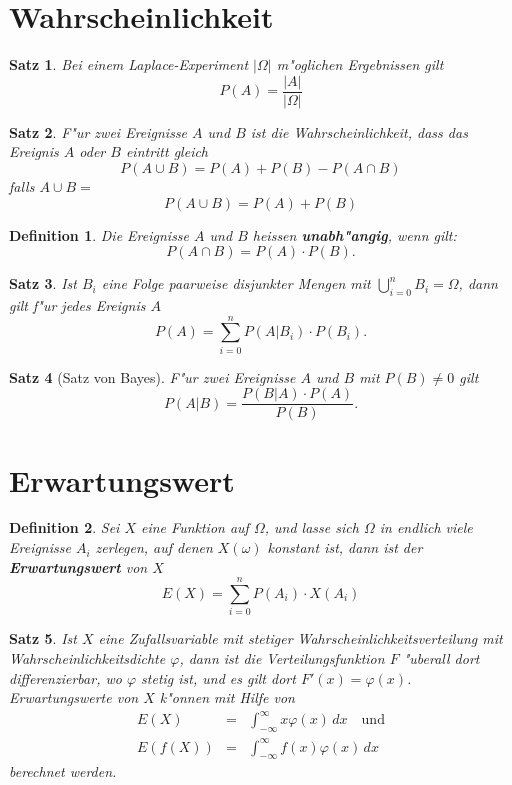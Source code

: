 \documentclass[ngerman, a4paper, 10pt, twocolumn, DIV20, headings=small]{scrartcl}
\newtheorem{definition}{Definition}
\newtheorem{satz}{Satz}
\begin{document}
\section{Wahrscheinlichkeit}
\label{sec:wahrscheinlichkeit}


\begin{satz}
  Bei einem Laplace-Experiment $| \Omega |$ m"oglichen Ergebnissen gilt
\[
P(A) = \frac{|A|}{|\Omega|}
\]
\end{satz}

\begin{satz}
F"ur zwei Ereignisse $A$ und $B$ ist die Wahrscheinlichkeit, dass das Ereignis $A$ oder $B$ eintritt gleich
\[
P(A\cup B) = P(A) + P(B) - P(A\cap B)
\]
falls $ A \cup B = {} $
\[
P(A\cup B) = P(A) + P(B)
\]
\end{satz}

\begin{definition}
Die Ereignisse $A$ und $B$ heissen {\bf unabh"angig}, wenn gilt:
\[
P(A\cap B) = P(A)\cdot P(B).
\]
\end{definition}

\begin{satz}
Ist $B_i$ eine Folge paarweise disjunkter Mengen mit $\bigcup_{i=0}^{n}B_i=\Omega$, dann gilt f"ur jedes Ereignis $A$
\[
P(A)=\sum_{i=0}^{n}P(A|B_i)\cdot P(B_i).
\]
\end{satz}

\begin{satz}[Satz von Bayes]
F"ur zwei Ereignisse $A$ und $B$ mit $P(B)\ne0$ gilt
\[
P(A|B)=\frac{P(B|A)\cdot P(A)}{P(B)}.
\]
\end{satz}

\section{Erwartungswert}
\label{sec:erwartungswert}


\begin{definition}
Sei $X$ eine Funktion auf $\Omega$, und lasse sich $\Omega$ in endlich
viele Ereignisse $A_i$ zerlegen, auf denen $X(\omega)$ konstant ist,
dann ist der {\bf Erwartungswert} von $X$
\[
E(X)=\sum_{i=0}^nP(A_i)\cdot X(A_i)
\]
\end{definition}

\begin{satz}
Ist $X$ eine Zufallsvariable mit stetiger
Wahrscheinlichkeitsverteilung mit Wahrscheinlichkeitsdichte
$\varphi$, dann
ist die Verteilungsfunktion $F$ "uberall dort differenzierbar, wo
$\varphi$ stetig ist, und es gilt dort
$F'(x)=\varphi(x)$.
Erwartungswerte von $X$ k"onnen mit Hilfe von
\begin{eqnarray*}
E(X)&=&\int_{-\infty}^{\infty}x\varphi(x)\,dx\quad\text{und}\\
E(f(X))&=&\int_{-\infty}^{\infty}f(x)\varphi(x)\,dx
\end{eqnarray*}
berechnet werden.
\end{satz}
\end{document}
